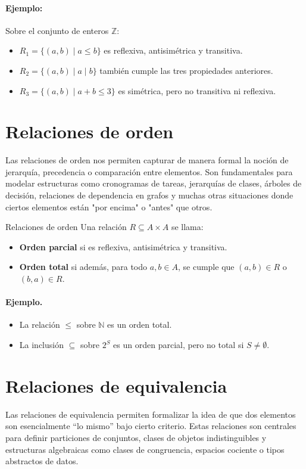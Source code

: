 \paragraph{Ejemplo:} Sobre el conjunto de enteros $\mathbb{Z}$:
\begin{itemize}
  \item $R_1 = \{(a,b) \mid a \leq b\}$ es reflexiva, antisimétrica y transitiva.
  \item $R_2 = \{(a,b) \mid a \mid b\}$ también cumple las tres propiedades anteriores.
  \item $R_3 = \{(a,b) \mid a + b \leq 3\}$ es simétrica, pero no transitiva ni reflexiva.
\end{itemize}

\section{Relaciones de orden}
Las relaciones de orden nos permiten capturar de manera formal la noción de jerarquía, precedencia o comparación entre elementos. Son fundamentales para modelar estructuras como cronogramas de tareas, jerarquías de clases, árboles de decisión, relaciones de dependencia en grafos y muchas otras situaciones donde ciertos elementos están "por encima" o "antes" que otros. 


\begin{definitionblock}{Relaciones de orden}
Una relación $R \subseteq A \times A$ se llama:
\begin{itemize}
  \item \textbf{Orden parcial} si es reflexiva, antisimétrica y transitiva.
  \item \textbf{Orden total} si además, para todo $a,b \in A$, se cumple que $(a,b) \in R$ o $(b,a) \in R$.
\end{itemize}
\end{definitionblock}

\paragraph{Ejemplo.}
\begin{itemize}
  \item La relación $\leq$ sobre $\mathbb{N}$ es un orden total.
  \item La inclusión $\subseteq$ sobre $2^S$ es un orden parcial, pero no total si $S \neq \emptyset$.
\end{itemize}



\section{Relaciones de equivalencia}
Las relaciones de equivalencia permiten formalizar la idea de que dos elementos son esencialmente ``lo mismo'' bajo cierto criterio. Estas relaciones son centrales para definir particiones de conjuntos, clases de objetos indistinguibles y estructuras algebraicas como clases de congruencia, espacios cociente o tipos abstractos de datos.


